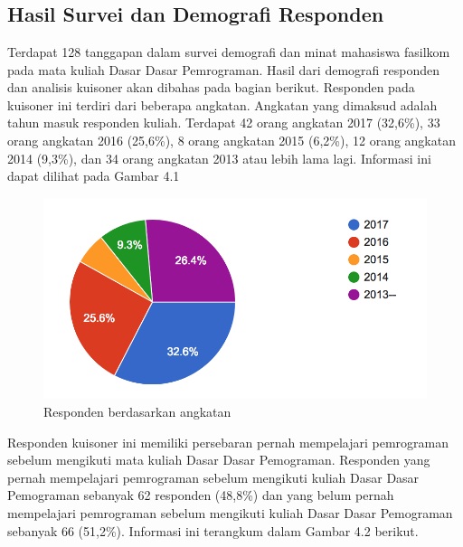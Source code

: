 \chapter{\babEmpat}
\section{Hasil Survei dan Demografi Responden}
Terdapat 128 tanggapan dalam survei demografi dan minat mahasiswa fasilkom pada mata kuliah Dasar Dasar Pemrograman. Hasil dari demografi responden dan analisis kuisoner akan dibahas pada bagian berikut.
\linebreak\linebreak
	Responden pada kuisoner ini terdiri dari beberapa angkatan. Angkatan yang dimaksud adalah tahun masuk responden kuliah. Terdapat 42 orang angkatan 2017 (32,6\%), 33 orang angkatan 2016 (25,6\%), 8 orang angkatan 2015 (6,2\%), 12 orang angkatan 2014 (9,3\%), dan 34 orang angkatan 2013 atau lebih lama lagi. Informasi ini dapat dilihat pada Gambar 4.1
	\begin{figure}
		\includegraphics{pics/angkatan}
		\caption{Responden berdasarkan angkatan}
		\centering
	\end{figure}
	Responden kuisoner ini memiliki persebaran pernah mempelajari pemrograman sebelum mengikuti mata kuliah Dasar Dasar Pemograman. Responden yang pernah mempelajari pemrograman sebelum mengikuti kuliah Dasar Dasar Pemograman sebanyak 62 responden (48,8\%) dan yang belum pernah mempelajari pemrograman sebelum mengikuti kuliah Dasar Dasar Pemograman sebanyak 66 (51,2\%). Informasi ini terangkum dalam Gambar 4.2 berikut.
